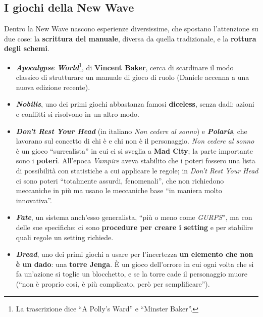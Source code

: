 \subsection{I giochi della New Wave}



Dentro la New Wave nascono esperienze diversissime, che spostano l'attenzione
su due cose: la \textbf{scrittura del manuale}, diversa da quella tradizionale,
e la \textbf{rottura degli schemi}.
\begin{itemize}
  \item \textbf{\emph{Apocalypse World}}\footnote{La trascrizione dice ``A
        Polly's Ward'' e ``Minster Baker''.}, di \textbf{Vincent Baker}, cerca di
        scardinare il modo classico di strutturare un manuale di gioco di ruolo
        (Daniele accenna a una nuova edizione recente).
  \item \textbf{\emph{Nobilis}}, uno dei primi giochi abbastanza famosi
        \textbf{diceless}, senza dadi: azioni e conflitti si risolvono in un
        altro modo.
  \item \textbf{\emph{Don't Rest Your Head}} (in italiano \emph{Non cedere al
        sonno}) e \textbf{\emph{Polaris}}, che lavorano sul concetto di chi è e
        chi non è il personaggio. \emph{Non cedere al sonno} è un gioco
        ``surrealista'' in cui ci si sveglia a \textbf{Mad City}; la parte
        importante sono i \textbf{poteri}. All'epoca \emph{Vampire} aveva
        stabilito che i poteri fossero una lista di possibilità con statistiche
        a cui applicare le regole; in \emph{Don't Rest Your Head} ci sono poteri
        ``totalmente assurdi, fenomenali'', che non richiedono meccaniche in più
        ma usano le meccaniche base ``in maniera molto innovativa''.
  \item \textbf{\emph{Fate}}, un sistema anch'esso generalista, ``più o meno
        come \emph{GURPS}'', ma con delle sue specifiche: ci sono
        \textbf{procedure per creare i setting} e per stabilire quali regole un
        setting richiede.
  \item \textbf{\emph{Dread}}, uno dei primi giochi a usare per l'incertezza
        \textbf{un elemento che non è un dado}: una \textbf{torre Jenga}. È un
        gioco dell'orrore in cui ogni volta che si fa un'azione si toglie un
        blocchetto, e se la torre cade il personaggio muore (``non è proprio
        così, è più complicato, però per semplificare'').
\end{itemize}

